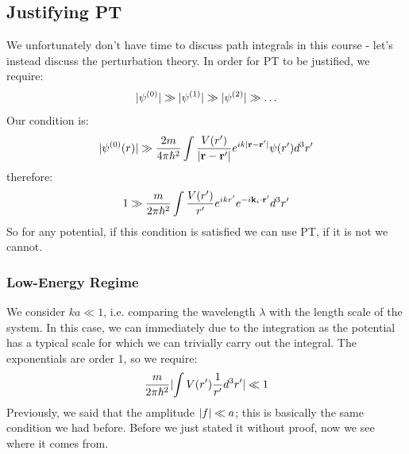 \subsection{Justifying PT}
We unfortunately don't have time to discuss path integrals in this course - let's instead discuss the perturbation theory. In order for PT to be justified, we require:
\begin{equation}
    \lvert \psi^{(0)} \rvert \gg \lvert \psi^{(1)} \rvert \gg \lvert \psi^{(2)} \rvert \gg \ldots
\end{equation}
Our condition is:
\begin{equation}
    \lvert \psi^{(0)}(r) \rvert \gg \frac{2m}{4\pi \hbar^2}\int \frac{V(r')}{\lvert \mathbf{r} - \mathbf{r}' \rvert}e^{ik\lvert \mathbf{r} - \mathbf{r}' \rvert}\psi(r')d^3r'
\end{equation}
therefore:
\begin{equation}
    1 \gg \frac{m}{2\pi \hbar^2}\int \frac{V(r')}{r'}e^{ikr'}e^{-i\mathbf{k}_i \cdot \mathbf{r}'}d^3r'
\end{equation}
So for any potential, if this condition is satisfied we can use PT, if it is not we cannot.

\subsubsection{Low-Energy Regime}
We consider $ka \ll 1$, i.e. comparing the wavelength $\lambda$ with the length scale of the system. In this case, we can immediately due to the integration as the potential has a typical scale for which we can trivially carry out the integral. The exponentials are order 1, so we require:
\begin{equation}
    \frac{m}{2\pi \hbar^2} \lvert \int V(r') \frac{1}{r'}d^3r' \rvert \ll 1
\end{equation}
Previously, we said that the amplitude $\lvert f \rvert \ll a$; this is basically the same condition we had before. Before we just stated it without proof, now we see where it comes from.

